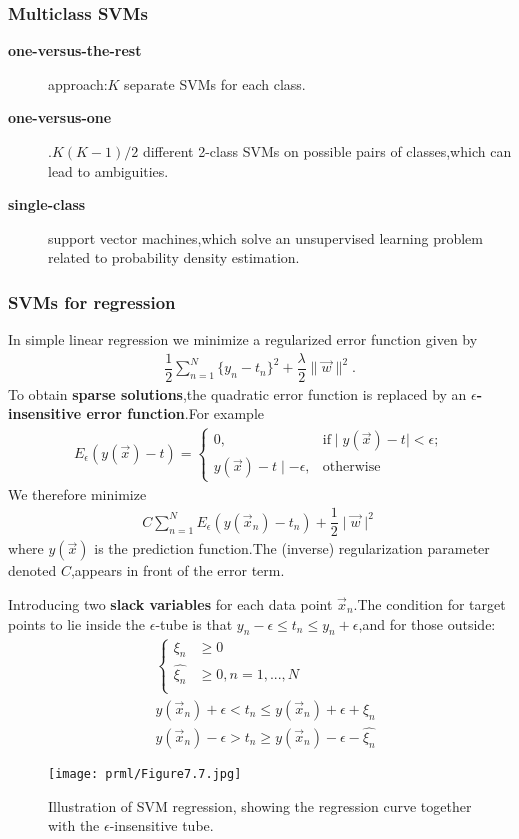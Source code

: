 \subsubsection{Multiclass SVMs}
\begin{description}
	\item[\textbf{one-versus-the-rest}] approach:$K$ separate SVMs for each class.
	\item[\textbf{one-versus-one}].$K(K-1)/2$ different 2-class SVMs on possible pairs of classes,which can lead to ambiguities.
	\item[\textbf{single-class}] support vector machines,which solve an unsupervised learning problem related to probability density estimation.
\end{description}

\subsubsection{SVMs for regression}
In simple linear regression we minimize a regularized error function given by
\begin{align}
\dfrac{1}{2}\sum\limits_{n=1}^{N}\{y_n-t_n\}^2+\dfrac{\lambda}{2}\parallel\vec{w}\parallel^2.
\end{align}
To obtain \textbf{sparse solutions},the quadratic error function is replaced by an \textbf{$\epsilon$-insensitive error function}.For example
\begin{align}
E_{\epsilon}(y(\vec{x})-t) = \begin{cases}
0,&\text{if}\mid y(\vec{x})-t\mid < \epsilon;\\
y(\vec{x})-t\mid - \epsilon,&\text{otherwise}
\end{cases}
\end{align}
We therefore minimize
\begin{align}
C\sum\limits_{n=1}^{N}E_{\epsilon}(y(\vec{x}_n)-t_n)+\dfrac{1}{2}\mid\vec{w}\mid^2
\end{align}
where $y(\vec{x})$ is the prediction function.The (inverse) regularization parameter denoted $C$,appears in front of the error term.

Introducing two \textbf{slack variables} for each data point $\vec{x}_n$.The condition for target points to lie inside the $\epsilon$-tube is that $y_n -\epsilon \leq t_n \leq y_n+\epsilon$,and for those outside:
\begin{align}
&\begin{cases}
\xi_n &\geq 0\\
\hat{\xi_n} &\geq 0,n=1,...,N\\
\end{cases}\\
& y(\vec{x}_n)+\epsilon < t_n \leq y(\vec{x}_n)+\epsilon +\xi_n \\
& y(\vec{x}_n)-\epsilon > t_n \geq y(\vec{x}_n)-\epsilon -\hat{\xi_n}
\end{align}
\begin{SCfigure*}
	\caption{Illustration of SVM regression, showing the regression curve together with the $\epsilon$-insensitive tube. }
	\texttt{[image: prml/Figure7.7.jpg]}
\end{SCfigure*}

